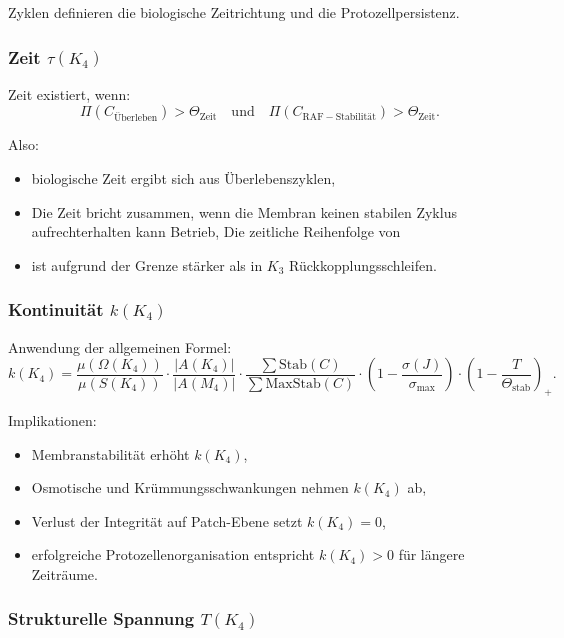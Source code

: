 Zyklen definieren die biologische Zeitrichtung und die Protozellpersistenz.

\subsubsection{Zeit \texorpdfstring{$\tau(K_4)$}{\tau(K_4)}}

Zeit existiert, wenn:
\[
\Pi(C_{\mathrm{Überleben}}) > \Theta_{\mathrm{Zeit}}
\quad\text{und}\quad
\Pi(C_{\mathrm{RAF-Stabilität}}) > \Theta_{\mathrm{Zeit}}.
\]

Also:
\begin{itemize}
    \item biologische Zeit ergibt sich aus Überlebenszyklen,
    \item Die Zeit bricht zusammen, wenn die Membran keinen stabilen Zyklus aufrechterhalten kann
          Betrieb,
    Die zeitliche Reihenfolge von \item ist aufgrund der Grenze stärker als in $K_3$
          Rückkopplungsschleifen.
\end{itemize}

\subsubsection{Kontinuität \texorpdfstring{$k(K_4)$}{k(K_4)}}

Anwendung der allgemeinen Formel:
\[
k(K_4) =
\frac{\mu(\Omega(K_4))}{\mu(S(K_4))}
\cdot
\frac{|A(K_4)|}{|A(M_4)|}
\cdot
\frac{\sum \mathrm{Stab}(C)}{\sum \mathrm{MaxStab}(C)}
\cdot
(1 - \frac{\sigma(J)}{\sigma_{\max}})
\cdot
(1 - \frac{T}{\Theta_{\mathrm{stab}}})_+.
\]

Implikationen:
\begin{itemize}
    \item Membranstabilität erhöht $k(K_4)$,
    \item Osmotische und Krümmungsschwankungen nehmen $k(K_4)$ ab,
    \item Verlust der Integrität auf Patch-Ebene setzt $k(K_4)=0$,
    \item erfolgreiche Protozellenorganisation entspricht
          $k(K_4)>0$ für längere Zeiträume.
\end{itemize}

\subsubsection{Strukturelle Spannung \texorpdfstring{$T(K_4)$}{T(K_4)}}

